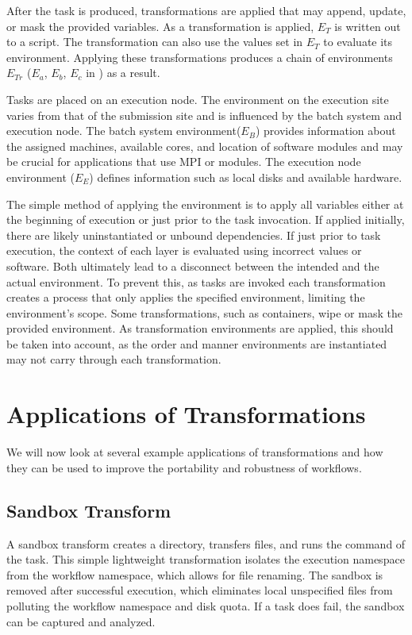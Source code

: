 \documentclass[conference]{IEEEtran}
\begin{document}
After the task is produced, 
transformations are applied that may 
append, update, or mask the provided variables.
As a transformation is applied, ${E_T}$ is 
written out to a script.
The transformation can also use the values set
in ${E_T}$ to evaluate its environment.
Applying these transformations produces
a chain of environments ${E_{Tr}}$ 
(${E_a}$, ${E_b}$, ${E_c}$ in ) 
as a result. 

Tasks are placed on an execution node. 
The environment on the execution site
varies from that of the submission site 
and is influenced by the batch system and execution node. 
The batch system environment(${E_B}$) provides
information about the assigned machines, available cores, and location of
software modules and may be crucial 
for applications that use MPI or modules. 
The execution node environment (${E_E}$) 
defines information such as 
local disks and available hardware.

The simple method of applying the environment is to 
apply all variables either 
at the beginning of execution or 
just prior to the task invocation. 
If applied initially, there are likely uninstantiated
or unbound dependencies. 
If just prior to task execution, the context 
of each layer is evaluated using incorrect values or software.
Both ultimately lead to a disconnect 
between the intended and the actual environment.
To prevent this, as tasks are invoked 
each transformation creates a process
that only applies the specified environment,
limiting the environment's scope.
Some transformations, such as containers, 
wipe or mask the provided environment.
As transformation environments are applied, 
this should be taken into account, 
as the order and manner environments are instantiated 
may not carry through each transformation.


\section{Applications of Transformations}

We will now look at several example applications of
transformations and how they can be used to improve the portability and robustness of workflows.

\subsection{Sandbox Transform}

A sandbox transform creates a directory,
transfers files, and runs the command 
of the task.
This simple lightweight transformation isolates
the execution namespace from the workflow namespace,
which allows for file renaming.
The sandbox is removed after successful execution,
which eliminates local unspecified files from
polluting the workflow namespace and disk quota.
If a task does fail, the sandbox can be captured
and analyzed.
\end{document}
